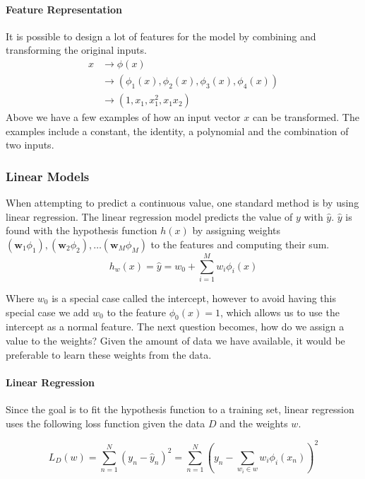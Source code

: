 \paragraph{Feature Representation}\label{sec:phi}
It is possible to design a lot of features for the model by combining and transforming the original inputs.
\begin{align*}
x &\rightarrow \phi(x) \\
&\rightarrow (\phi_1(x), \phi_2(x), \phi_3(x), \phi_4(x)) \\
&\rightarrow (1, x_1, x_1^2, x_1x_2)
\end{align*} 
Above we have a few examples of how an input vector $x$ can be transformed.
The examples include a constant, the identity, a polynomial and the combination of two inputs.

\subsubsection{Linear Models}

When attempting to predict a continuous value, one standard method is by using linear regression.
The linear regression model predicts the value of $y$ with $\hat{y}$. $\hat{y}$ is found with the hypothesis function $h(x)$ by assigning weights $(\mathbf{w}_1\phi_1),(\mathbf{w}_2\phi_2), \dots (\mathbf{w}_M\phi_M)$ to the features and computing their sum.
\[h_w(x) = \hat{y} = w_0 + \sum_{i=1}^M w_i \phi_i(x) \]

Where $w_0$ is a special case called the intercept, however to avoid having this special case we add  $w_0$ to the feature $\phi_0(x)=1$, which allows us to use the intercept as a normal feature. 
The next question becomes, how do we assign a value to the weights?
Given the amount of data we have available, it would be preferable to learn these weights from the data. 

\paragraph{Linear Regression}
Since the goal is to fit the hypothesis function to a training set, linear regression uses the following loss function given the data $D$ and the weights $w$.

\[ L_D(w) = \sum_{n=1}^N (y_n-\hat{y}_n)^2 = \sum_{n=1}^N (y_n - \sum_{w_i \in w} w_i \phi_i(x_n))^2 \] 

